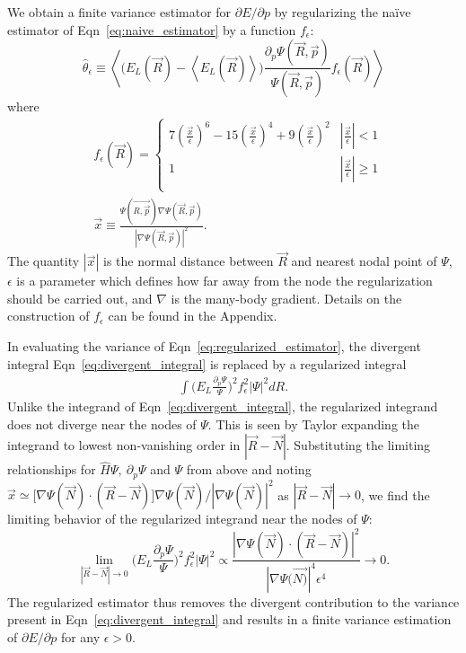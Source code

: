 \documentclass[twocolumn]{revtex4-1}
\begin{document}
We obtain a finite variance estimator for $\partial E/\partial p$ by regularizing the na\"ive estimator of Eqn~\ref{eq:naive_estimator} by a function $f_\epsilon$:
\begin{equation}
\hat{\theta}_\epsilon \equiv \left\langle \Big(E_L(\vec{R})  - \left\langle E_L(\vec{R}) \right \rangle\Big)\frac{\partial_p \Psi(\vec{R}, \vec{p})}{\Psi(\vec{R}, \vec{p})} f_\epsilon(\vec{R}) \right\rangle
\label{eq:regularized_estimator}
\end{equation}
where 
\begin{equation}
\begin{split}
&f_\epsilon(\vec{R}) = \begin{cases} 
     7(\frac{\vec{x}}{\epsilon})^6 - 15(\frac{\vec{x}}{\epsilon})^4 + 9(\frac{\vec{x}}{\epsilon})^2 & |\frac{\vec{x}}{\epsilon}| < 1 \\
      1 & |\frac{\vec{x}}{\epsilon}| \ge 1 \\
   \end{cases}\\ 
 &\vec{x} \equiv \frac{\Psi(\vec{R, \vec{p}}) \nabla \Psi(\vec{R}, \vec{p})}{|\nabla \Psi(\vec{R}, \vec{p})|^2}.
\end{split}
\label{eq:regularizing_function}
\end{equation} 
The quantity $|\vec{x}|$ is the normal distance between $\vec{R}$ and nearest nodal point of $\Psi$, $\epsilon$ is a parameter which defines how far away from the node the regularization should be carried out, and $\nabla$ is the many-body gradient.
Details on the construction of $f_\epsilon$ can be found in the Appendix.

In evaluating the variance of Eqn~\ref{eq:regularized_estimator}, the divergent integral Eqn~\ref{eq:divergent_integral} is replaced by a regularized integral
\begin{equation}
\begin{split}
\int \Big(E_L\frac{\partial_p\Psi}{\Psi}\Big)^2 f_\epsilon^2 |\Psi|^2 dR.
\end{split}
\label{eq:convergent_integral}
\end{equation}
Unlike the integrand of Eqn~\ref{eq:divergent_integral}, the regularized integrand does not diverge near the nodes of $\Psi$. 
This is seen by Taylor expanding the integrand to lowest non-vanishing order in $|\vec{R} - \vec{N}|$. 
Substituting the limiting relationships for $\hat{H}\Psi, \ \partial_p \Psi$ and $\Psi$ from above and noting $\vec{x} \simeq \Big[\nabla\Psi(\vec{N}) \cdot (\vec{R} - \vec{N}) \Big]\nabla \Psi(\vec{N}) / |\nabla \Psi(\vec{N})|^2$ as $|\vec{R} - \vec{N}| \rightarrow 0$, we find the limiting behavior of the regularized integrand near the nodes of $\Psi$: 
\begin{equation}
\lim_{|\vec{R} - \vec{N}| \rightarrow 0 } \Big(E_L\frac{\partial_p\Psi}{\Psi}\Big)^2 f_\epsilon^2 |\Psi|^2 \propto \frac{|\nabla\Psi(\vec{N}) \cdot (\vec{R} - \vec{N})|^2}{|\nabla\Psi(\vec{N)}|^4 \epsilon^4}\rightarrow 0.
\label{eq:convergent_integrand}
\end{equation}
The regularized estimator thus removes the divergent contribution to the variance present in Eqn~\ref{eq:divergent_integral} and results in a finite variance estimation of $\partial E/\partial p$ for any $\epsilon > 0$.
\end{document}
